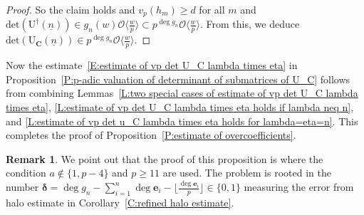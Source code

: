 \documentclass[12pt]{amsart}
\theoremstyle{definition}
\newtheorem{remark}[subsection]{Remark}
\numberwithin{equation}{subsection}
\def\calO{\mathcal{O}}
\def\bfB{\mathbf{B}}
\def\bfe{\mathbf{e}}
\def\bfC{\mathbf{C}}
\def\rmU{\mathrm{U}}
\renewcommand{\det}{\mathrm{det}}
\begin{document}
\begin{proof}
So the claim holds and $v_p(h_m)\geq d$ for all $m$ and $\det(\rmU^\dagger(\underline n))\in g_n(w) \calO\langle \frac wp\rangle\subset p^{\deg g_n} \calO\langle \frac wp\rangle$. From this, we deduce $\det(\rmU_\bfC(\underline n))\in p^{\deg g_n} \calO\langle \frac wp\rangle$.
\end{proof}

Now the estimate~\eqref{E:estimate of vp det U_C lambda times eta} in Proposition~\ref{P:p-adic valuation of determinant of submatrices of U_C} follows from combining Lemmas~\ref{L:two special cases of estimate of vp det U_C lambda times eta}, \ref{L:estimate of vp det U_C lambda times eta holds if lambda neq n}, and \ref{L:estimate of vp det u_C lambda times eta holds for lambda=eta=n}. This completes the proof of Proposition~\ref{P:estimate of overcoefficients}.



















\medskip











\begin{remark}
\label{R:a=1p-4}
We point out that the proof of this proposition is where the condition $a \notin \{1, p-4\}$ and $p \geq 11$ are used. The problem is rooted in the number $\boldsymbol{\delta} = \deg g_n - \sum_{i=1}^n \deg \bfe_i - \big\lfloor \frac{\deg \bfe_i}p\big\rfloor  \in \{0,1\}$ measuring the error from halo estimate in Corollary~\ref{C:refined halo estimate}.
\end{remark}
\end{document}
